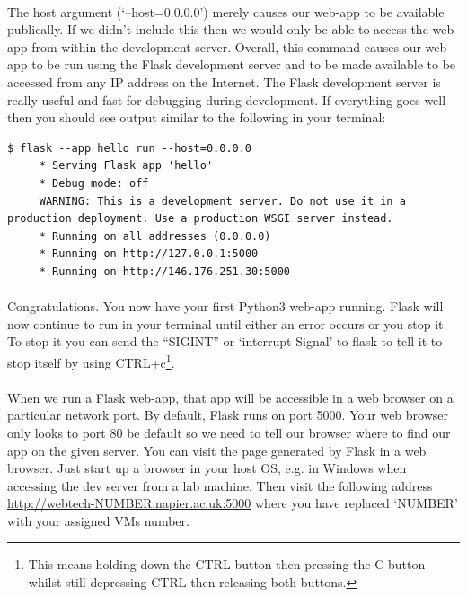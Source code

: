 \documentclass[12pt, a4paper, oneside]{book}
\begin{document}
\paragraph{} The host argument (`--host=0.0.0.0') merely causes our web-app to be available publically. If we didn't include this then we would only be able to access the web-app from within the development server. Overall, this command causes our web-app to be run using the Flask development server and to be made available to be accessed from any IP address on the Internet. The Flask development server is really useful and fast for debugging during development. If everything goes well then you should see output similar to the following in your terminal:

\begin{lstlisting}[style=DOS]
     $ flask --app hello run --host=0.0.0.0
     * Serving Flask app 'hello'
     * Debug mode: off
     WARNING: This is a development server. Do not use it in a production deployment. Use a production WSGI server instead.
     * Running on all addresses (0.0.0.0)
     * Running on http://127.0.0.1:5000
     * Running on http://146.176.251.30:5000
 \end{lstlisting}

\paragraph{} Congratulations. You now have your first Python3 web-app running. Flask will now continue to run in your terminal until either an error occurs or you stop it. To stop it you can send the ``SIGINT'' or `interrupt Signal' to flask to tell it to stop itself by using CTRL+c\footnote{This means holding down the CTRL button then pressing the C button whilst still depressing CTRL then releasing both buttons.}.

\paragraph{} When we run a Flask web-app, that app will be accessible in a web browser on a particular network port. By default, Flask runs on port 5000. Your web browser only looks to port 80 be default so we need to tell our browser where to find our app on the given server. You can visit the page generated by Flask in a web browser. Just start up a browser in your host OS, e.g. in Windows when accessing the dev server from a lab machine. Then visit the following address \url{http://webtech-NUMBER.napier.ac.uk:5000} where you have replaced `NUMBER' with your assigned VMs number.
\end{document}

